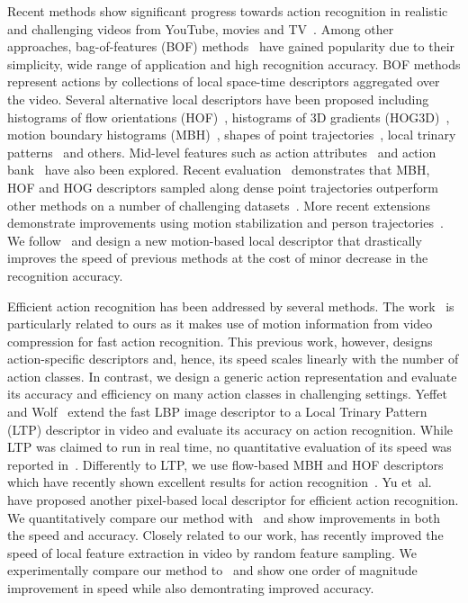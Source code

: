 Recent methods show significant progress towards action
recognition in realistic and challenging videos from YouTube,
movies and
TV~\cite{Laptev08,Laptev07,Liu11,Niebles10,Rodriguez08,Sadanand12,Wang12}.
Among other approaches, bag-of-features (BOF)
methods~\cite{Dollar05,Laptev05,Schuldt04} have gained
popularity due to their simplicity, wide range of application
and high recognition accuracy.
BOF methods represent actions by collections of local space-time descriptors aggregated over the video.
Several alternative local descriptors have been proposed
including histograms of flow orientations (HOF)~\cite{Laptev08},
histograms of 3D gradients
(HOG3D)~\cite{klaser2008spatio,Scovanner07}, motion boundary
histograms (MBH)~\cite{Dalal06,Wang12}, shapes of point
trajectories~\cite{Matikainen09,Messing09,Wang12}, local trinary patterns~\cite{Kliper12,Yeffet09} and others. 
Mid-level features such as action attributes~\cite{Liu11} and action
bank~\cite{Sadanand12} have also been explored. Recent
 evaluation~\cite{Wang12} demonstrates that MBH, HOF
and HOG descriptors sampled along dense point trajectories
outperform other
methods on a number of challenging datasets~\cite{Wang12}. 
More recent extensions demonstrate improvements using motion stabilization and person trajectories~\cite{Jain13,Wang13}.
We follow~\cite{Wang12} and design a new motion-based local
descriptor that drastically improves the speed of previous
methods at the cost of minor decrease in the recognition
accuracy.



Efficient action recognition has been addressed by several
methods. The work~\cite{mpeg3,mpeg2,mpeg1} is particularly
related to ours as it makes use of motion information from video compression for fast action recognition. This previous work,
however, designs action-specific descriptors and, hence, its
speed scales linearly with the number of action classes. In
contrast, we design a generic action representation and evaluate its accuracy and efficiency on many action classes in
challenging settings.
Yeffet and Wolf~\cite{Yeffet09} extend the fast LBP image
descriptor to a Local Trinary Pattern (LTP) descriptor in video
and evaluate its accuracy on action recognition. While LTP was
claimed to run in real time, no quantitative evaluation of its
speed was reported in~\cite{Yeffet09}. Differently to LTP, we
use flow-based MBH and HOF descriptors which have recently shown excellent results for action recognition~\cite{Wang12}. Yu
et~al.~\cite{Yu10} have proposed another pixel-based local
descriptor for efficient action recognition. We quantitatively
compare our method with~\cite{Yu10} and show improvements in
both the speed and accuracy.
Closely related to our work, \cite{Feng13} has 
recently improved the speed of local feature extraction in video
by random feature sampling.
We experimentally compare our method to~\cite{Feng13}
and show one order of magnitude improvement in speed while 
also demontrating improved accuracy.


